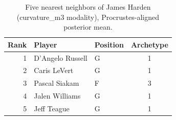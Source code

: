 \begin{table}[htbp]
  \centering\small
  \begin{tabular}{rllc}
    \toprule
    Rank & Player & Position & Archetype \\
    \midrule
    1 & D'Angelo Russell & G & 1 \\
    2 & Caris LeVert & G & 1 \\
    3 & Pascal Siakam & F & 3 \\
    4 & Jalen Williams & G & 1 \\
    5 & Jeff Teague & G & 1 \\
    \bottomrule
  \end{tabular}
  \caption{Five nearest neighbors of James Harden (curvature_m3 modality), Procrustes-aligned posterior mean.}
  \label{tab:James_Harden_neighbors_curvature_m3}
\end{table}

